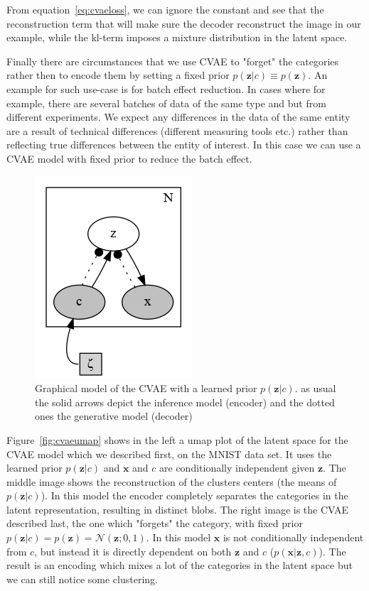 \documentclass[11pt, a4paper]{report}
\theoremstyle{plain}
\theoremstyle{definition}
\theoremstyle{remark}
\newcommand{\x}{\mathbf{x}}
\newcommand{\z}{\mathbf{z}}
\newcommand{\NN}{\mathcal{N}}
\begin{document}
From equation~\ref{eq:cvaeloss}, we can ignore the constant and see that the
reconstruction term that will make sure the decoder reconstruct the image in
our example, while the kl-term imposes a mixture distribution in the latent
space.

Finally there are circumstances that we use CVAE to "forget" the categories
rather then to encode them by setting a fixed prior $p(\z | c) \equiv p(\z)$.
An example for such use-case is for batch effect reduction.
In cases where for example, there are several batches of data
of the same type and but from different experiments.
We expect any differences in the data of the same entity are a result of technical differences 
(different measuring tools etc.) rather than reflecting true differences between
the entity of interest.
In this case we can use
a CVAE model with fixed prior to reduce the batch effect.

\begin{figure}[!h]
\begin{framed}
\centering
\includegraphics[width=0.4 \textwidth]{plots/cvae.gv.png}
\caption{Graphical model of the CVAE with a learned prior $p(\z | c)$.
as usual the solid arrows depict the inference model (encoder) and the dotted
ones the generative model (decoder)}
\label{fig:cvae}
\end{framed}
\end{figure}

Figure~\ref{fig:cvaeumap} shows in the left a umap plot of the latent space for
the CVAE model which we described first, on the MNIST data set.
It uses the learned prior $p(\z|c)$ and
$\x$ and $c$ are conditionally independent given $\z$.
The middle image shows the reconstruction of the clusters centers (the means of
$p(\z | c)$). In this model the encoder completely separates the categories in
the latent representation, resulting in distinct blobs.
The right image is the CVAE described last, the one which "forgets" the
category, with fixed prior $p(\z | c) = p(\z) = \NN(\z;0,1)$.
In this model $\x$ is not conditionally independent from $c$, but instead it 
is directly dependent on both $\z$ and $c$ ($p(\x | \z, c)$).
The result is an encoding which mixes a lot of the categories in the latent
space but we can still notice some clustering.
\end{document}
